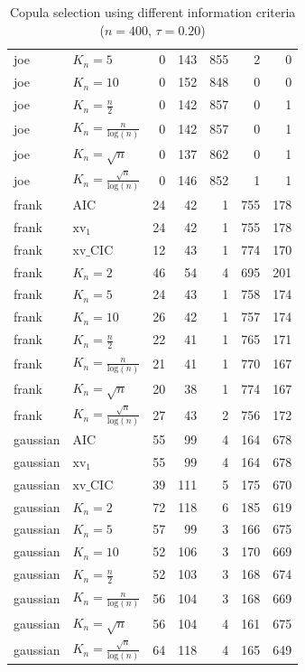 \begin{table}[htbp]
\begin{tabular}{llrrrrr}
  joe & $K_{n}=5$ & 0 & 143 & 855 & 2 & 0 \\ 
  joe & $K_{n}=10$ & 0 & 152 & 848 & 0 & 0 \\ 
  joe & $K_{n}=\tfrac{n}{2}$ & 0 & 142 & 857 & 0 & 1 \\ 
  joe & $K_{n}=\tfrac{n}{\text{log}(n)}$ & 0 & 142 & 857 & 0 & 1 \\ 
  joe & $K_{n}=\sqrt{n}$ & 0 & 137 & 862 & 0 & 1 \\ 
  joe & $K_{n}=\tfrac{\sqrt{n}}{\text{log}(n)}$ & 0 & 146 & 852 & 1 & 1 \\ 
   \hdashline
frank & AIC & 24 & 42 & 1 & 755 & 178 \\ 
  frank & $\text{xv}_{1}$ & 24 & 42 & 1 & 755 & 178 \\ 
  frank & $\text{xv}\_\text{CIC}$ & 12 & 43 & 1 & 774 & 170 \\ 
  frank & $K_{n}=2$ & 46 & 54 & 4 & 695 & 201 \\ 
  frank & $K_{n}=5$ & 24 & 43 & 1 & 758 & 174 \\ 
  frank & $K_{n}=10$ & 26 & 42 & 1 & 757 & 174 \\ 
  frank & $K_{n}=\tfrac{n}{2}$ & 22 & 41 & 1 & 765 & 171 \\ 
  frank & $K_{n}=\tfrac{n}{\text{log}(n)}$ & 21 & 41 & 1 & 770 & 167 \\ 
  frank & $K_{n}=\sqrt{n}$ & 20 & 38 & 1 & 774 & 167 \\ 
  frank & $K_{n}=\tfrac{\sqrt{n}}{\text{log}(n)}$ & 27 & 43 & 2 & 756 & 172 \\ 
   \hdashline
gaussian & AIC & 55 & 99 & 4 & 164 & 678 \\ 
  gaussian & $\text{xv}_{1}$ & 55 & 99 & 4 & 164 & 678 \\ 
  gaussian & $\text{xv}\_\text{CIC}$ & 39 & 111 & 5 & 175 & 670 \\ 
  gaussian & $K_{n}=2$ & 72 & 118 & 6 & 185 & 619 \\ 
  gaussian & $K_{n}=5$ & 57 & 99 & 3 & 166 & 675 \\ 
  gaussian & $K_{n}=10$ & 52 & 106 & 3 & 170 & 669 \\ 
  gaussian & $K_{n}=\tfrac{n}{2}$ & 52 & 103 & 3 & 168 & 674 \\ 
  gaussian & $K_{n}=\tfrac{n}{\text{log}(n)}$ & 56 & 104 & 3 & 168 & 669 \\ 
  gaussian & $K_{n}=\sqrt{n}$ & 56 & 104 & 4 & 161 & 675 \\ 
  gaussian & $K_{n}=\tfrac{\sqrt{n}}{\text{log}(n)}$ & 64 & 118 & 4 & 165 & 649 \\ 
   \hline
\end{tabular}
\caption{Copula selection using different information criteria ($n = 400$, $\tau = 0.20$)} 
\end{table}


